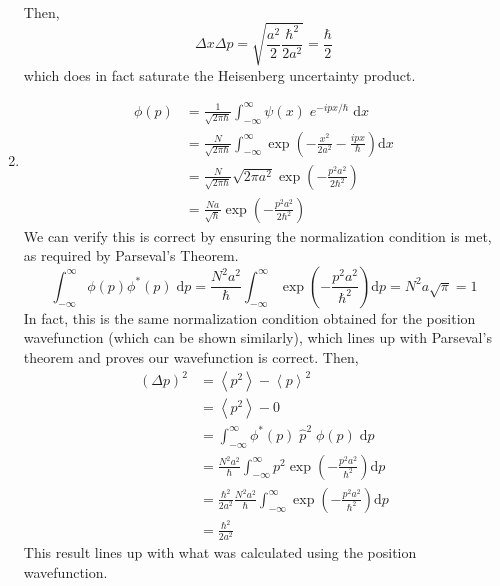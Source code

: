\begin{sol}
\begin{enumerate}[label=\textbf{(\alph*)}]
\begin{align*}
\end{align*}
Then, $$\Delta x\Delta p = \sqrt{\frac{a^2}{2}\frac{\hbar^2}{2a^2}} = \frac{\hbar}{2}$$ which does in fact saturate the Heisenberg uncertainty product.
\item
\begin{align*}
\phi(p) &= \frac{1}{\sqrt{2\pi\hbar}}\int_{-\infty}^{\infty}\psi(x)\;e^{-ipx/\hbar}\;\mathrm{d}x \\ &= \frac{N}{\sqrt{2\pi\hbar}}\int_{-\infty}^{\infty}\operatorname{exp}\left(-\frac{x^2}{2a^2} - \frac{ipx}{\hbar}\right)\mathrm{d}x \\ &= \frac{N}{\sqrt{2\pi\hbar}}\sqrt{2\pi a^2}\operatorname{exp}\left(-\frac{p^2a^2}{2\hbar^2}\right) \\ &= \frac{Na}{\sqrt{\hbar}}\operatorname{exp}\left(-\frac{p^2a^2}{2\hbar^2}\right)
\end{align*}We can verify this is correct by ensuring the normalization condition is met, as required by Parseval's Theorem. $$\int_{-\infty}^{\infty}\phi(p)\phi^*(p)\;\mathrm{d}p = \frac{N^2a^2}{\hbar}\int_{-\infty}^{\infty}\operatorname{exp}\left(-\frac{p^2a^2}{\hbar^2}\right)\mathrm{d}p = N^2a\sqrt{\pi} = 1$$In fact, this is the same normalization condition obtained for the position wavefunction (which can be shown similarly), which lines up with Parseval's theorem and proves our wavefunction is correct. Then, \begin{align*}
\left(\Delta p\right)^2 &= \left<p^2\right> - \left<p\right>^2 \\ &= \left<p^2\right> - 0 \\ &= \int_{-\infty}^{\infty}\phi^*(p)\;\hat{p}^2\;\phi(p)\;\mathrm{d}p\\ &= \frac{N^2a^2}{\hbar}\int_{-\infty}^{\infty}p^2\operatorname{exp}\left(-\frac{p^2a^2}{\hbar^2}\right)\mathrm{d}p \\ &= \frac{\hbar^2}{2a^2}\frac{N^2a^2}{\hbar}\int_{-\infty}^{\infty}\operatorname{exp}\left(-\frac{p^2a^2}{\hbar^2}\right)\mathrm{d}p \\ &= \frac{\hbar^2}{2a^2}
\end{align*}This result lines up with what was calculated using the position wavefunction.
\end{enumerate}
\end{sol}



